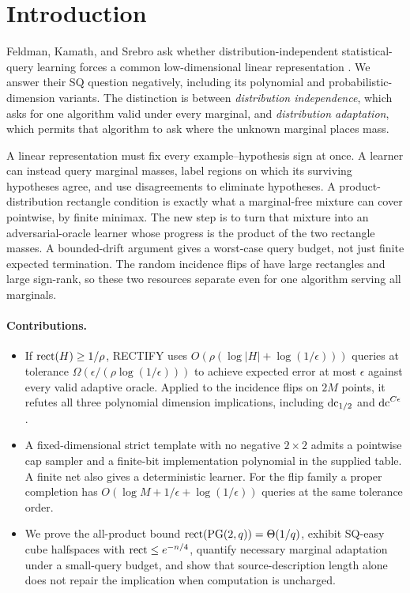 \section{Introduction}
Feldman, Kamath, and Srebro ask whether distribution-independent statistical-query learning forces a common low-dimensional linear representation \citep{FKS26}. We answer their SQ question negatively, including its polynomial and probabilistic-dimension variants. The distinction is between \emph{distribution independence}, which asks for one algorithm valid under every marginal, and \emph{distribution adaptation}, which permits that algorithm to ask where the unknown marginal places mass.

A linear representation must fix every example--hypothesis sign at once. A learner can instead query marginal masses, label regions on which its surviving hypotheses agree, and use disagreements to eliminate hypotheses. A product-distribution rectangle condition is exactly what a marginal-free mixture can cover pointwise, by finite minimax. The new step is to turn that mixture into an adversarial-oracle learner whose progress is the product of the two rectangle masses. A bounded-drift argument gives a worst-case query budget, not just finite expected termination. The random incidence flips of \citet{HHPTZ22} have large rectangles and large sign-rank, so these two resources separate even for one algorithm serving all marginals.

\paragraph{Contributions.}
\begin{itemize}
\item If $\operatorname{rect}(H)\ge1/\rho$, RECTIFY uses $O(\rho(\log|H|+\log(1/\epsilon)))$ queries at tolerance $\Omega(\epsilon/(\rho\log(1/\epsilon)))$ to achieve expected error at most $\epsilon$ against every valid adaptive oracle. Applied to the incidence flips on $2M$ points, it refutes all three polynomial dimension implications, including $\operatorname{dc}_{1/2}$ and $\operatorname{dc}^{C\epsilon}$.
\item A fixed-dimensional strict template with no negative $2\times2$ admits a pointwise cap sampler and a finite-bit implementation polynomial in the supplied table. A finite net also gives a deterministic learner. For the flip family a proper completion has $O(\log M+1/\epsilon+\log(1/\epsilon))$ queries at the same tolerance order.
\item We prove the all-product bound $\operatorname{rect}(\operatorname{PG}(2,q))=\Theta(1/q)$, exhibit SQ-easy cube halfspaces with $\operatorname{rect}\le e^{-n/4}$, quantify necessary marginal adaptation under a small-query budget, and show that source-description length alone does not repair the implication when computation is uncharged.
\end{itemize}

